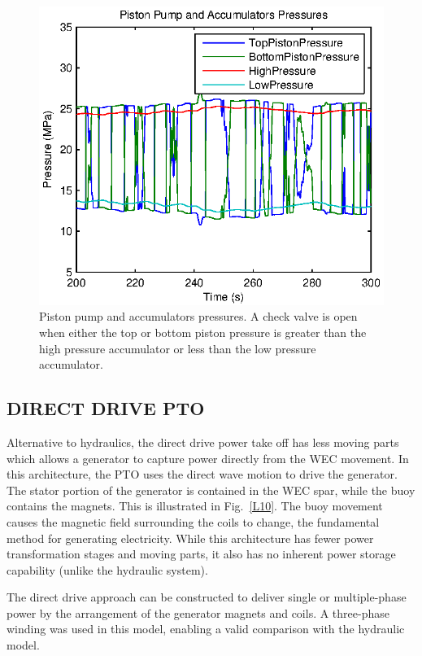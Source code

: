 \documentclass[twocolumn,10pt]{asme2e}
\begin{document}
\begin{figure}[t]
    \centering
    \includegraphics[width=1\columnwidth]{Images/Pressures}
    \caption{Piston pump and accumulators pressures. A check valve is open when either the top or bottom piston pressure is greater than the high pressure accumulator or less than the low pressure accumulator.}
    \label{HydPr}
    \end{figure}
    
    
\subsection*{DIRECT DRIVE PTO}
Alternative to hydraulics, the direct drive power take off has less moving parts which allows a generator to capture power directly from the WEC movement. In this architecture, the PTO uses the direct wave motion to drive the generator. The stator portion of the generator is contained in the WEC spar, while the buoy contains the magnets. This is illustrated in Fig.~\ref{L10}. The buoy movement causes the magnetic field surrounding the coils to change, the fundamental method for generating electricity. While this architecture has fewer power transformation stages and moving parts, it also has no inherent power storage capability (unlike the hydraulic system).

The direct drive approach can be constructed to deliver single or multiple-phase power by the arrangement of the generator magnets and coils. A three-phase winding was used in this model, enabling a valid comparison with the hydraulic model.  
\end{document}
